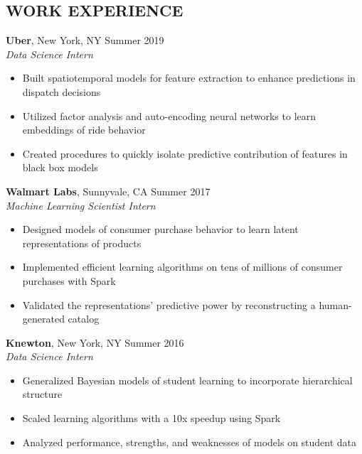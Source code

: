 \documentclass{res}
\begin{document}
\begin{resume}
\section{WORK EXPERIENCE}
\textbf{Uber}, New York, NY \hfill{Summer 2019}\\
\textit{Data Science Intern}
\begin{itemize}
\item Built spatiotemporal models for feature extraction to enhance predictions in dispatch decisions
\item Utilized factor analysis and auto-encoding neural networks to learn embeddings of ride behavior
\item Created procedures to quickly isolate predictive contribution of features in black box  models
\end{itemize}
\vspace{-2mm}  
\textbf{Walmart Labs}, Sunnyvale, CA \hfill{Summer 2017}\\
\textit{Machine Learning Scientist Intern}
\begin{itemize}
\item Designed models of consumer purchase behavior to learn latent representations of products
\item Implemented efficient learning algorithms on tens of millions of consumer purchases with Spark
\item Validated the representations' predictive power by reconstructing a human-generated catalog
\end{itemize}


\textbf{Knewton}, New York, NY \hfill{Summer 2016}\\
\textit{Data Science Intern}
\begin{itemize}
\item Generalized Bayesian models of student learning to incorporate hierarchical structure 
\item Scaled learning algorithms with a 10x speedup using Spark
\item Analyzed performance, strengths, and weaknesses of models on student data
\end{itemize}


\end{resume}
\end{document}
